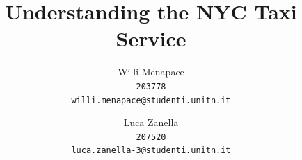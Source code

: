 \documentclass{acm_proc_article-sp-sigmod09}
\begin{document}
%

\title{Understanding the NYC Taxi Service}
%


\author{
	Willi Menapace\\
	\texttt{203778}\\
	\texttt{willi.menapace@studenti.unitn.it}
	\and
	Luca Zanella\\
	\texttt{207520}\\
	\texttt{luca.zanella-3@studenti.unitn.it}
}

%
%
\end{document}
